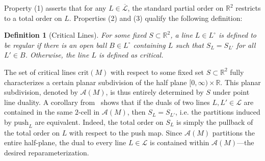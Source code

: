\documentclass[sn-mathphys]{sn-jnl}
\newtheorem{definition}{Definition}
\begin{document}
Property (1) asserts that for any $L \in \overline{\mathcal{L}}$, the standard partial order on $\mathbb{R}^2$ restricts to a total order on $L$. Properties (2) and (3) qualify the following definition:
\begin{definition}[Critical Lines]
	For some fixed $S \subset \mathbb{R}^2$, a line $L \in L^\circ$ is defined to be \emph{regular} if there is an open ball $B \in L^\circ$ containing $L$ such that $S_L = S_{L'}$ for all $L' \in B$. Otherwise, the line $L$ is defined as \emph{critical}. 
\end{definition}
\noindent The set of critical lines $\mathrm{crit}(M)$ with respect to some fixed set $S \subset \mathbb{R}^2$ fully characterizes a certain planar subdivision of the half plane $[0, \infty) \times \mathbb{R}$. 
This planar subdivision, denoted by $\mathcal{A}(M)$, is thus entirely determined by $S$ under point line duality.
A corollary from~\cite{lesnick2015interactive} shows that if the duals of two lines $L, L' \in \mathcal{L}$ are contained in the same $2$-cell in $\mathcal{A}(M)$, then $S_L = S_{L'}$, i.e. the partitions induced by $\mathrm{push}_L$ are equivalent. Indeed, the total order on $S_L$ is simply the pullback of the total order on $L$ with respect to the push map.
Since $\mathcal{A}(M)$ partitions the entire half-plane, the dual to every line $L \in \mathcal{L}$ is contained within $\mathcal{A}(M)$---the desired reparameterization. 
\end{document}
